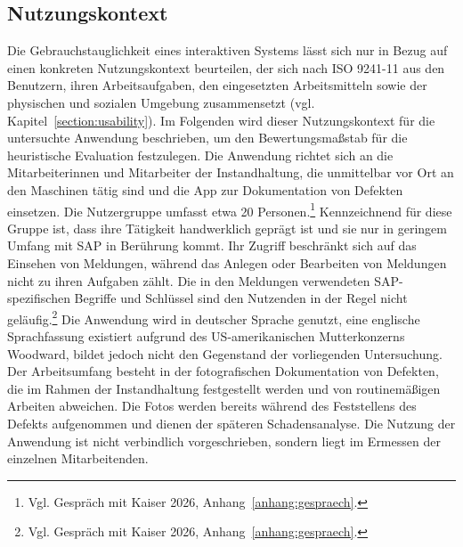 \subsection{Nutzungskontext}

Die Gebrauchstauglichkeit eines interaktiven Systems lässt sich nur in Bezug auf einen konkreten Nutzungskontext beurteilen, der sich 
nach ISO 9241-11 aus den Benutzern, ihren Arbeitsaufgaben, den eingesetzten Arbeitsmitteln sowie der physischen und sozialen Umgebung 
zusammensetzt (vgl. Kapitel~\ref{section:usability}). Im Folgenden wird dieser Nutzungskontext für die untersuchte Anwendung beschrieben, 
um den Bewertungsmaßstab für die heuristische Evaluation festzulegen.
Die Anwendung richtet sich an die Mitarbeiterinnen und Mitarbeiter 
der Instandhaltung, die unmittelbar vor Ort an den Maschinen tätig sind und die App zur Dokumentation von Defekten einsetzen. Die 
Nutzergruppe umfasst etwa 20 Personen.\footnote{Vgl. Gespräch mit Kaiser 2026, Anhang~\ref{anhang:gespraech}.} 
Kennzeichnend für diese Gruppe ist, dass ihre Tätigkeit handwerklich geprägt ist und sie nur in geringem Umfang mit SAP in 
Berührung kommt. Ihr Zugriff beschränkt sich auf das Einsehen von Meldungen, während das Anlegen oder Bearbeiten von Meldungen nicht zu 
ihren Aufgaben zählt. Die in den Meldungen verwendeten SAP-spezifischen Begriffe und Schlüssel sind den Nutzenden in der Regel nicht 
geläufig.\footnote{Vgl. Gespräch mit Kaiser 2026, Anhang~\ref{anhang:gespraech}.} Die Anwendung wird in 
deutscher Sprache genutzt, eine englische Sprachfassung existiert aufgrund des US-amerikanischen Mutterkonzerns Woodward, bildet jedoch 
nicht den Gegenstand der vorliegenden Untersuchung.
Der Arbeitsumfang besteht in der fotografischen Dokumentation von Defekten, die im Rahmen der Instandhaltung festgestellt werden und 
von routinemäßigen Arbeiten abweichen. Die Fotos werden bereits während des Feststellens des Defekts aufgenommen und dienen der späteren 
Schadensanalyse. Die Nutzung der Anwendung ist nicht verbindlich vorgeschrieben, sondern liegt im Ermessen der einzelnen Mitarbeitenden.

